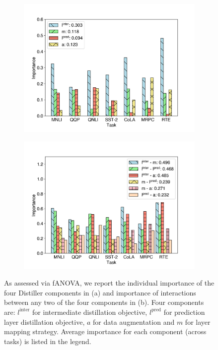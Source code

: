 \documentclass[11pt]{article}
\begin{document}
\begin{figure}[!tb]
    \centering
    \begin{subfigure}[b]{0.4\textwidth}
    \centering
    \includegraphics[width=1.0\textwidth]{pics/fanova_single_wo_stsb.png}
    \caption{}
    \end{subfigure}
    \begin{subfigure}[b]{0.4\textwidth}
    \centering
    \includegraphics[width=1.0\textwidth]{pics/fanova_double_wo_stsb.png}
    \caption{}
    \end{subfigure}
    \caption{As assessed via fANOVA, we report the individual importance of the four Distiller components in (a) and importance of interactions between any two of the four components in (b). Four components are: $l^{\text{inter}}$ for intermediate distillation objective, $l^{\text{pred}}$ for prediction layer distillation objective, $a$ for data augmentation and $m$ for layer mapping strategy. Average importance for each component (across tasks) is listed in the legend.}
    \label{fig:fanova}
    \vspace{-1em}
\end{figure}
\end{document}
